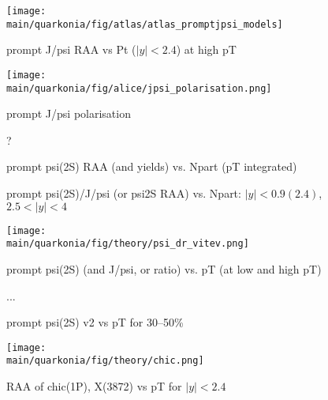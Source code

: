 \documentclass[../report.tex]{subfiles}
\providecommand{\main}{..}
\begin{document}
\begin{figure}
\begin{center}
 \texttt{[image: \\main/quarkonia/fig/atlas/atlas\_promptjpsi\_models]}
\end{center}

 \caption{prompt J/psi RAA vs Pt ($|y|<2.4$) at high pT~\cite{Aaboud:2018quy}}
\end{figure}

\begin{figure}
\begin{center}
\texttt{[image: \\main/quarkonia/fig/alice/jpsi\_polarisation.png]}
\end{center}

 \caption{prompt J/psi polarisation~\cite{Abelev:1475243}}
\end{figure}

\begin{figure}
\begin{center}
 ?
\end{center}

 \caption{prompt psi(2S) RAA (and yields) vs. Npart (pT integrated) }
\end{figure}

\begin{figure}
\begin{center}
\end{center}

 \caption{prompt psi(2S)/J/psi (or psi2S RAA) vs. Npart: $|y|<0.9 (2.4)$, $2.5<|y|<4$}
\end{figure}

\begin{figure}
\begin{center}
 \texttt{[image: \\main/quarkonia/fig/theory/psi\_dr\_vitev.png]}
\end{center}

 \caption{prompt psi(2S) (and J/psi, or ratio) vs. pT (at low and high pT) }
\end{figure}

\begin{figure}
...

 \caption{prompt psi(2S) v2 vs pT for 30--50\%}
\end{figure}

\begin{figure}
\begin{center}
 \texttt{[image: \\main/quarkonia/fig/theory/chic.png]}
\end{center}

 \caption{RAA of chic(1P), X(3872) vs pT for $|y|<2.4$}
\end{figure}
\end{document}
